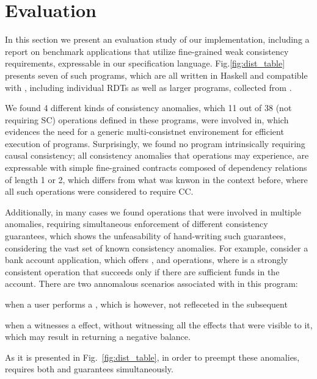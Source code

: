 \newpage
\section{Evaluation}
\label{sec:eval}
%

In this section we present an evaluation study of our implementation,
including a report on
benchmark applications that utilize fine-grained weak consistency
requirements, expressable
in our specification language.
Fig.\ref{fig:dist_table} presents seven of such programs, 
which are all written in Haskell and compatible with \tool, 
including individual RDTs as well as larger programs, collected
from \cite{quelea}.

We found 4 different kinds of consistency anomalies, which 11 out of 38
(not requiring SC) operations defined in these programs, were involved
in, which evidences the need for a generic multi-consistnet environement for
efficient execution of programs. Surprisingly, we found no program
intrinsically requiring causal consistency; all consistency anomalies that operations
may experience, are expressable with simple fine-grained contracts
composed of dependency relations of length 1 or 2,
which differs from what was knwon in the context before, where all such
operations were considered to require CC.

Additionally, in many cases we found operations that were involved in
multiple anomalies, requiring simultaneous enforcement of different
consistency guarantees, which shows the unfeasability of hand-writing
such guarantees, considering the vast set of known consistency
anomalies. 
%
For example, consider a bank account application, which offers
\dRV{}, \wdRV{} and \gbRV{} operations, where \wdRV{} is a
strongly consistent operation that succeeds only if there are sufficient
funds in the account. There are two annomalous scenarios associated with
\gbRV{} in this program:
\begin{enumerate*}[label=(\roman*)]
\item when a user performs a \dRV{}, which is however, not refleceted
in the subsequent \gbRV{}
\item when a \gbRV{} witnesses a \wdRV{} effect, without witnessing all
the \dRV{} effects that were visible to it,
which may result in \gbRV{} returning a
negative balance.
\end{enumerate*}
As it is presented in Fig.~\ref{fig:dist_table}, in order to preempt
these anomalies, \gbRV{} requires
both \rmwCTRT{} and \visCTRT{} guarantees simultaneously.


